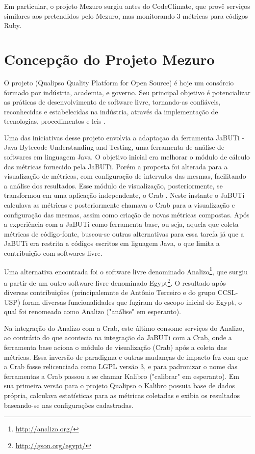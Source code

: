 Em particular, o projeto Mezuro surgiu antes do CodeClimate, que provê serviços similares aos pretendidos pelo Mezuro, mas monitorando 3 métricas para códigos Ruby.

\section{Concepção do Projeto Mezuro}

O projeto (Qualipso Quality Platform for Open Source) é hoje um consórcio formado por indústria, academia, e governo. Seu principal objetivo é potencializar as práticas de desenvolvimento de software livre, tornando-as confiáveis, reconhecidas e estabelecidas na indústria, através da implementação de tecnologias, procedimentos e leis \cite{qualipso2009}. 
	
Uma das iniciativas desse projeto envolvia  a adaptaçao da ferramenta JaBUTi - Java Bytecode Understanding and Testing, uma ferramenta de análise de softwares em linguagem Java. O objetivo inicial era melhorar o módulo de cálculo das métricas fornecido pela JaBUTi. Porém a proposta foi alterada para a visualização de métricas, com configuração de intervalos das mesmas, facilitando a análise dos resultados. Esse módulo de visualização, posteriormente, se transformou em uma aplicação independente, o Crab \cite{meirelles2009crab}. Neste instante o JaBUTi calculava as métricas e posteriormente chamava o Crab para a visualização e configuração das mesmas,  assim como criação de novas métricas compostas. Após a experiência com a JaBUTi como ferramenta base, ou seja, aquela que coleta métricas de código-fonte, buscou-se outras alternativas para essa tarefa já que a JaBUTi era restrita a códigos escritos  em liguagem Java, o que limita a contribuição com softwares livre.

Uma alternativa encontrada foi o software livre denominado Analizo\footnote{\url{http://analizo.org/}}, que surgiu a partir de um outro software livre denominado Egypt\footnote{\url{http://gson.org/egypt/}}. O resultado após diversas contribuições (principalemnte de Antônio Terceiro e do grupo CCSL-USP) foram diversas funcionalidades que fugiram do escopo inicial do Egypt, o qual foi renomeado como Analizo ("análise" em esperanto). %

Na integração do Analizo com a Crab, este último consome serviços do Analizo, ao contrário do que acontecia na integração da JaBUTi com a Crab, onde a ferramenta base aciona o módulo de visualização (Crab) após a coleta das métricas. Essa inversão de paradigma e outras mudanças de impacto fez com que a Crab fosse relicenciada como LGPL versão 3, e para padronizar o nome das ferramentas a Crab passou a se chamar Kalibro ("calibrar" em esperanto). Em sua primeira versão para o projeto Qualipso o Kalibro possuia base de dados própria, calculava estatísticas para as métricas coletadas e exibia os resultados baseando-se nas configurações cadastradas. 

